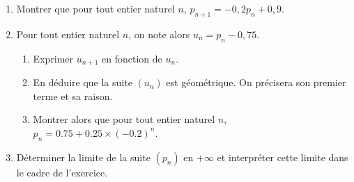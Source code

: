 \documentclass[11pt,fleqn, openany]{book} %
\begin{document}
\begin{exercise}[topic=prob01]
\begin{center}
\end{center}
  \begin{enumerate}  
    \item Montrer que pour tout entier naturel $n$, $p_{n+1}=-0,2p_n+0,9$.
    \item Pour tout entier naturel $n$, on note alors $u_n=p_n-0,75$.
    \begin{enumerate}
        \item Exprimer $u_{n+1}$ en fonction de $u_n$.
        \item En déduire que la suite $(u_n)$ est géométrique. On précisera son premier terme et sa raison.
        \item Montrer alors que pour tout entier naturel $n$, $p_n=0.75+0.25\times(-0.2)^n$.
    \end{enumerate}
    \item Déterminer la limite de la suite $(p_n)$ en $+\infty$ et interpréter cette limite dans le cadre de l'exercice.
\end{enumerate}
\end{exercise}
\end{document}
